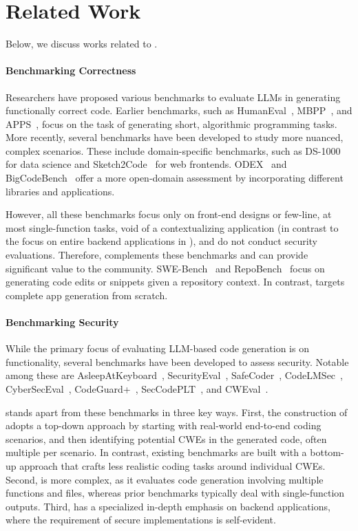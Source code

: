 \section{Related Work}

Below, we discuss works related to \benchmark{}.

\paragraph{Benchmarking Correctness}
Researchers have proposed various benchmarks to evaluate LLMs in generating functionally correct code.
Earlier benchmarks, such as HumanEval~\citep{humaneval}, MBPP~\citep{mbpp}, and APPS~\citep{apps}, focus on the task of generating short, algorithmic programming tasks.
More recently, several benchmarks have been developed to study more nuanced, complex scenarios.
These include domain-specific benchmarks, such as DS-1000~\citep{dsonek} for data science and Sketch2Code~\citep{sketch2code} for web frontends.
ODEX~\citep{odex} and BigCodeBench~\citep{bigcodebench} offer a more open-domain assessment by incorporating different libraries and applications.

However, all these benchmarks focus only on front-end designs or few-line, at most single-function tasks, void of a contextualizing application (in contrast to the focus on entire backend applications in \benchmark{}), and do not conduct security evaluations.
Therefore, \benchmark{} complements these benchmarks and can provide significant value to the community.
SWE-Bench~\citep{swebench} and RepoBench~\citep{repobench} focus on generating code edits or snippets given a repository context.
In contrast, \benchmark{} targets complete app generation from scratch.

\paragraph{Benchmarking Security}
While the primary focus of evaluating LLM-based code generation is on functionality, several benchmarks have been developed to assess security.
Notable among these are AsleepAtKeyboard~\citep{asleep}, SecurityEval~\citep{securityeval}, SafeCoder~\citep{safecoder}, CodeLMSec~\citep{codelmsec}, CyberSecEval~\citep{cyberseceval}, CodeGuard+~\citep{codeguard}, SecCodePLT~\citep{seccodeplt}, and CWEval~\citep{cweval}.

\benchmark{} stands apart from these benchmarks in three key ways.
First, the construction of \benchmark{} adopts a top-down approach by starting with real-world end-to-end coding scenarios, and then identifying potential CWEs in the generated code, often multiple per scenario.
In contrast, existing benchmarks are built with a bottom-up approach that crafts less realistic coding tasks around individual CWEs.
Second, \benchmark{} is more complex, as it evaluates code generation involving multiple functions and files, whereas prior benchmarks typically deal with single-function outputs.
Third, \benchmark{} has a specialized in-depth emphasis on backend applications, where the requirement of secure implementations is self-evident.


